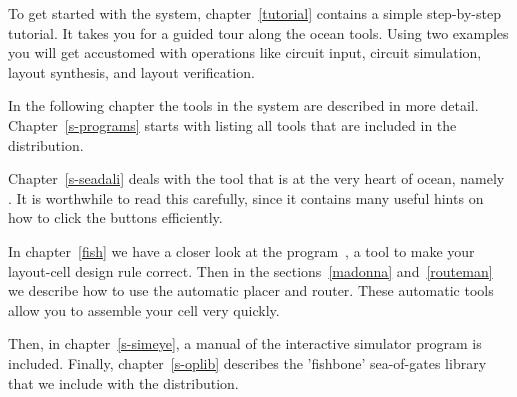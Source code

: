 To get started with the system, chapter~\ref{tutorial} contains a simple
step-by-step tutorial. It takes you for a guided tour along the {\sc ocean}
tools.  Using two examples you will get accustomed with operations like circuit
input, circuit simulation, layout synthesis, and layout verification.

In the following chapter the tools in the  system are described in
more detail. Chapter~\ref{s-programs} starts with listing all tools that are
included in the
 distribution. 

Chapter~\ref{s-seadali} deals with the tool that is at the very heart of
{\sc ocean}, namely .  It is worthwhile to read
this carefully, since it contains many useful hints on how to click the buttons
efficiently.

In chapter~\ref{fish} we have a closer look at the program~, a tool
to make your layout-cell design rule correct.  Then in the
sections~\ref{madonna} and~\ref{routeman} we describe how to use the automatic
placer and router.  These automatic tools allow you to assemble your cell very
quickly.

Then, in chapter~\ref{s-simeye}, a manual of the interactive simulator program
is included.  Finally, chapter~\ref{s-oplib} describes the 'fishbone'
sea-of-gates library that we include with the distribution.
